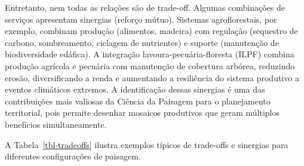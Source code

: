 \documentclass[
  portuguese,
  11pt,
  a4paper,
  open=any]{scrbook}
\begin{document}
Entretanto, nem todas as relações são de trade-off. Algumas combinações
de serviços apresentam sinergias (reforço mútuo). Sistemas
agroflorestais, por exemplo, combinam produção (alimentos, madeira) com
regulação (sequestro de carbono, sombreamento, ciclagem de nutrientes) e
suporte (manutenção de biodiversidade edáfica). A integração
lavoura-pecuária-floresta (ILPF) combina produção agrícola e pecuária
com manutenção de cobertura arbórea, reduzindo erosão, diversificando a
renda e aumentando a resiliência do sistema produtivo a eventos
climáticos extremos. A identificação dessas sinergias é uma das
contribuições mais valiosas da Ciência da Paisagem para o planejamento
territorial, pois permite desenhar mosaicos produtivos que geram
múltiplos benefícios simultaneamente.

A Tabela~\ref{tbl-tradeoffs} ilustra exemplos típicos de trade-offs e
sinergias para diferentes configurações de paisagem.
\end{document}
